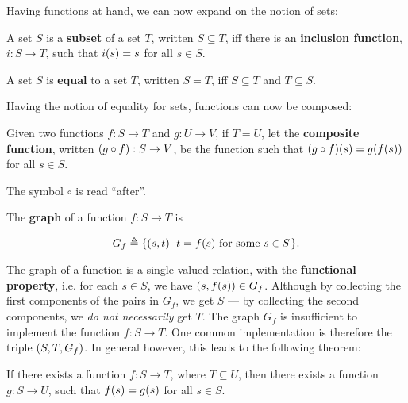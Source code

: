 Having functions at hand, we can now expand on the notion of sets:

\begin{definition} \label{def:subset} A set $S$ is a \textbf{subset} of a set
$T$, written $S \subseteq T$, iff there is an \textbf{inclusion function}, $i :
S \rightarrow T$, such that $i\mathopen{}\left({s}\right)\mathclose{}=s$ for all $s \in S$. \end{definition}

\begin{definition} \label{def:seteq} A set $S$ is \textbf{equal} to a set $T$,
written $S=T$, iff $S\subseteq T$ and $T\subseteq S$. \end{definition}

Having the notion of equality for sets, functions can now be composed:

\begin{definition} \label{def:compose} Given two functions $f : S \rightarrow
T$ and $g : U \rightarrow V$, if $T = U$, let the \textbf{composite function},
written $\mathopen{}\left({g\circ f}\right)\mathclose{} : S \rightarrow V$, be the function such that $\mathopen{}\left({g\circ
f}\right)\mathclose{}\mathopen{}\left({s}\right)\mathclose{}=g\mathopen{}\left({f\mathopen{}\left({s}\right)\mathclose{}}\right)\mathclose{}$ for all $s \in S$.  \end{definition}

\begin{notation} The symbol $\circ$ is read ``after''.\end{notation}


\begin{definition} \label{def:graph} The \textbf{graph} of a function $f : S
\rightarrow T$ is

$$G_f\triangleq\mathopen{}\left\{{\mathopen{}\left({s,t}\right)\mathclose{}\mathopen{}\left|\ {\text{$t=f\mathopen{}\left({s}\right)\mathclose{}$ for some $s\in S$}}\right.\mathclose{}}\right\}\mathclose{}.$$

\end{definition}

The graph of a function is a single-valued relation, with the
\textbf{functional property}, i.e. for each $s\in S$, we have $\mathopen{}\left({s,f\mathopen{}\left({s}\right)\mathclose{}}\right)\mathclose{} \in
G_f$. Although by collecting the first components of the pairs in $G_f$, we get
$S$ --- by collecting the second components, we \emph{do not necessarily} get
$T$.  The graph $G_f$ is insufficient to implement the function $f :
S\rightarrow T$.  One common implementation is therefore the triple
$\mathopen{}\left({S,T,G_f}\right)\mathclose{}$. In general however, this leads to the following theorem:

\begin{theorem} \label{thm:codomain-subtyping} If there exists a function $f :
S \rightarrow T$, where $T\subseteq U$, then there exists a function $g : S
\rightarrow U$, such that $f\mathopen{}\left({s}\right)\mathclose{}=g\mathopen{}\left({s}\right)\mathclose{}$ for all $s\in S$. \end{theorem}

